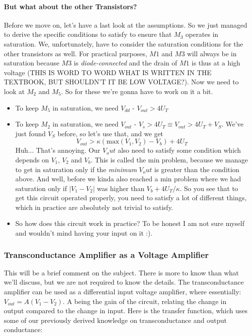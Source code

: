 \paragraph{But what about the other Transistors?}

Before we move on, let's have a last look at the assumptions. So we just managed to derive the specific conditions to satisfy to ensure that $M_3$ operates in saturation. We, unfortunately, have to consider the saturation conditions for the other transistors as well. For practical purposes, $M1$ and $M3$ will always be in saturation because $M3$ is \textit{diode-connected} and the drain of $M1$ is thus at a high voltage (THIS IS WORD TO WORD WHAT IS WRITTEN IN THE TEXTBOOK, BUT SHOULDN'T IT BE LOW VOLTAGE?). Now we need to look at $M_2$ and $M_5$. So for these we're gonna have to work on it a bit. 
\begin{itemize}
    \item To keep $M_5$ in saturation, we need $V_{dd}$ - $V_{out} > 4 U_T$
    \item To keep $M_2$ in saturation, we need $V_{out}$ - $V_{s} > 4 U_T \equiv V_{out} > 4 U_T +  V_S$. We've just found $V_S$ before, so let's use that, and we get
    \begin{equation}
        V_{out} > \kappa (\mathrm{max}(V_1, V_2) - V_b) + 4 U_T
    \end{equation}
    Huh... That's annoying. Our $V_out$ also need to satisfy some condition which depends on $V_1$, $V_2$ and $V_b$. This is called the min problem, because we manage to get in saturation only if the \textit{minimum} $V_out$ is greater than the condition above. And well, before we kinda also reached a min problem where we had saturation only if $|V_1 - V_2|$ was higher than $V_b + 4U_T/ \kappa$. So you see that to get this circuit operated properly, you need to satisfy a lot of different things, which in practice are absolutely not trivial to satisfy. 
    \item So how does this circuit work in practice? To be honest I am not sure myself and wouldn't mind having your input on it :). 
\end{itemize}


\subsubsection{Transconductance Amplifier as a Voltage Amplifier}

This will be a brief comment on the subject. There is more to know than what we'll discuss, but we are not required to know the details. The transconductance amplifier can be used as a differential input voltage amplifier, where essentially: $V_{out} = A(V_1 - V_2)$. A being the gain of the circuit, relating the change in output compared to the change in input. Here is the transfer function, which uses some of our previously derived knowledge on transconductance and output conductance: 

